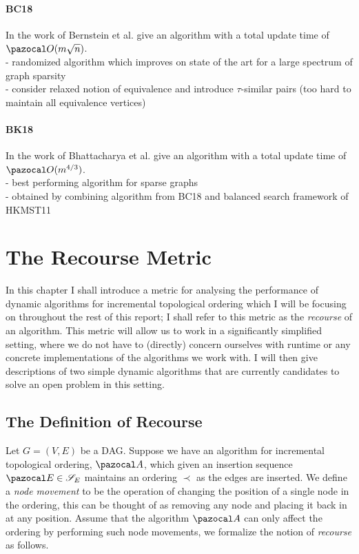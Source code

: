 \documentclass{report}
\begin{document}
\subsubsection{BC18}

In the work of \cite{BernsteinC18} Bernstein et al. give an algorithm with a total update time of $\pazocal O(m \sqrt n)$.\\
- randomized algorithm which improves on state of the art for a large spectrum of graph sparsity\\
- consider relaxed notion of equivalence and introduce $\tau$-similar pairs (too hard to maintain all equivalence vertices)

\subsubsection{BK18}

In the work of \cite{BhattacharyaK20} Bhattacharya et al. give an algorithm with a total update time of $\pazocal O(m^{4/3})$.\\
- best performing algorithm for sparse graphs\\
- obtained by combining algorithm from BC18 and balanced search framework of HKMST11

\chapter{The Recourse Metric}\label{chapter3}

In this chapter I shall introduce a metric for analysing the performance of dynamic algorithms for incremental topological ordering which I will be focusing on throughout the rest of this report; I shall refer to this metric as the \textit{recourse} of an algorithm. This metric will allow us to work in a significantly simplified setting, where we do not have to (directly) concern ourselves with runtime or any concrete implementations of the algorithms we work with. I will then give descriptions of two simple dynamic algorithms that are currently candidates to solve an open problem in this setting.

\section{The Definition of Recourse}

Let $G=(V,E)$ be a DAG. Suppose we have an algorithm for incremental topological ordering, $\pazocal A$, which given an insertion sequence $\pazocal E \in \mathcal S_E$ maintains an ordering $\prec$ as the edges are inserted. We define a \textit{node movement} to be the operation of changing the position of a single node in the ordering, this can be thought of as removing any node and placing it back in at any position. Assume that the algorithm $\pazocal A$ can only affect the ordering by performing such node movements, we formalize the notion of \textit{recourse} as follows.
\end{document}
